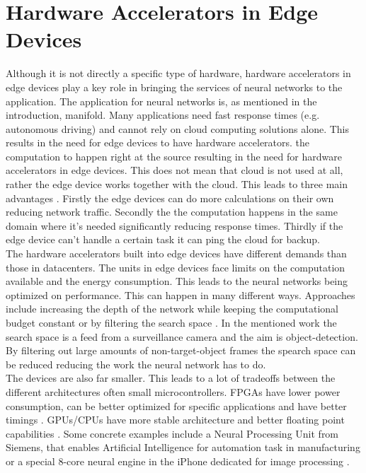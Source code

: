 \documentclass[conference]{IEEEtran}
\begin{document}
	\section{Hardware Accelerators in Edge Devices}
	Although it is not directly a specific type of hardware, hardware accelerators in edge devices play a key role in bringing the services of neural networks to the application. The application for neural networks is, as mentioned in the introduction, manifold. Many applications need fast response times (e.g. autonomous driving) and cannot rely on cloud computing solutions alone. This results in the need for edge devices to have hardware accelerators. the computation to happen right at the source resulting in the need for hardware accelerators in edge devices. This does not mean that cloud is not used at all, rather the edge device works together with the cloud. This leads to three main advantages \cite{wang2020convergence}. Firstly the edge devices can do more calculations on their own reducing network traffic. Secondly the the computation happens in the same domain where it's needed significantly reducing response times. Thirdly if the edge device can't handle a certain task it can ping the cloud for backup.
	\\
	The hardware accelerators built into edge devices have different demands than those in datacenters. The units in edge devices face limits on the computation available and the energy consumption. This leads to the neural networks being optimized on performance. This can happen in many different ways. Approaches include increasing the depth of the network while keeping the computational budget constant \cite{szegedy2015going} or by filtering the search space \cite{zhang2018ffs}. In the mentioned work the search space is a feed from a surveillance camera and the aim is object-detection. By filtering out large amounts of non-target-object frames the spearch space can be reduced reducing the work the neural network has to do.
	\\
	The devices are also far smaller. This leads to a lot of tradeoffs between the different architectures often small microcontrollers. FPGAs have lower power consumption, can be better optimized for specific applications and have better timings \cite{jiang2018accelerating}. GPUs/CPUs have more stable architecture and better floating point capabilities \cite{chen2019exploring}. Some concrete examples include a Neural Processing Unit from Siemens, that enables Artificial Intelligence for automation task in manufacturing \cite{siemensnpu} or a special 8-core neural engine in the iPhone dedicated for image processing \cite{applenpu}.
	\\
	
\end{document}
